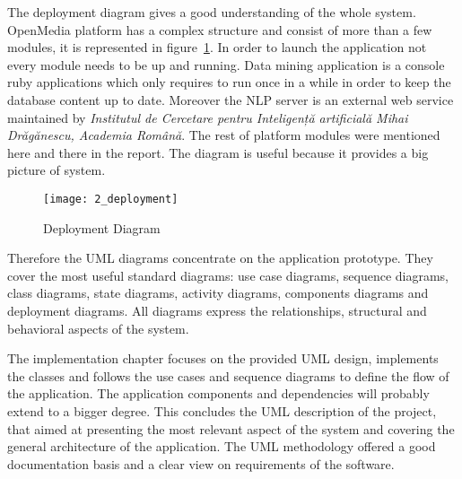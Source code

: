 The deployment diagram gives a good understanding of the whole system. OpenMedia platform has a complex structure and consist of more than a few modules, it is represented in \mbox{figure \ref{deployment}}. In order to launch the application not every module needs to be up and running. Data mining application is a console ruby applications which only requires to run once in a while in order to keep the database content up to date. Moreover the NLP server is an external web service maintained by \emph{Institutul de Cercetare pentru Inteligență artificială Mihai Drăgănescu, Academia Română}. The rest of platform modules were mentioned here and there in the report. The diagram is useful because it provides a big picture of system.

\begin{figure}[!ht]
\centering
\texttt{[image: 2\_deployment]}
\caption{Deployment Diagram}\label{deployment}
\end{figure}

Therefore the UML diagrams concentrate on the application prototype. They cover the most useful standard diagrams: use case diagrams, sequence diagrams, class diagrams, state diagrams, activity diagrams, components diagrams and deployment diagrams. All diagrams express the relationships, structural and behavioral aspects of the system.

The implementation chapter focuses on the provided UML design, implements the classes and follows the use cases and sequence diagrams to define the flow of the application. The application components and dependencies will probably extend to a bigger degree. This concludes the UML description of the project, that aimed at presenting the most relevant aspect of the system and covering the general architecture of the application. The UML methodology offered a good documentation basis and a clear view on requirements of the software.